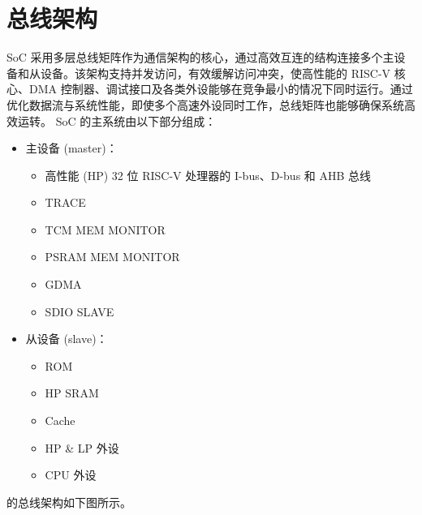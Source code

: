 \documentclass[main\_\_CN.tex]{subfiles}
\begin{document}
\setchineseformatting


\ifglobal
\else
    \clearpage
    \listoftodos
    \listofdonetodos
    \tableofcontents
\fi



\hypertarget{busarch}{}
\chapter{总线架构}
\label{mod:busarch}


\chipname{} SoC 采用多层总线矩阵作为通信架构的核心，通过高效互连的结构连接多个主设备和从设备。该架构支持并发访问，有效缓解访问冲突，使高性能的 RISC-V 核心、DMA 控制器、调试接口及各类外设能够在竞争最小的情况下同时运行。通过优化数据流与系统性能，即使多个高速外设同时工作，总线矩阵也能够确保系统高效运转。
\chipname{} SoC 的主系统由以下部分组成：

\begin{itemize}
    \item 主设备 (master)：
        \begin{itemize}
            \item 高性能 (HP) 32 位 RISC-V 处理器的 I-bus、D-bus 和 AHB 总线
            \item TRACE
            \item TCM MEM MONITOR
            \item PSRAM MEM MONITOR
            \item GDMA
            \item SDIO SLAVE
        \end{itemize}
    \item 从设备 (slave)：
        \begin{itemize}
            \item ROM
            \item HP SRAM
            \item Cache
            \item HP \& LP 外设
            \item CPU 外设
        \end{itemize}
\end{itemize}

\chipname{} 的总线架构如下图所示。
\end{document}
